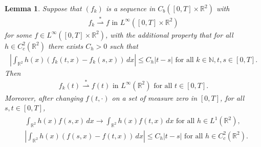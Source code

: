 \documentclass[11pt,reqno,xcolor=svgnames]{amsart}
\def\R{{\mathbb R}}
\def\N{{\mathbb N}}
\theoremstyle{plain}
\newtheorem{lemma}[theorem]{Lemma}
\theoremstyle{definition}
\theoremstyle{plain}
\theoremstyle{remark}
\newcommand{\abs}[1]{\left\vert#1\right\vert}
\newcommand{\iny}{\ensuremath{\infty}}
\newcommand{\wstar}{\overset{*}{\rightharpoonup}}
\begin{document}
\begin{lemma}\label{L:WeakStarSectionalConvergence}
    Suppose that  $(f_k)$ is a sequence in $C_b([0, T] \times \R^2)$ with
    \begin{align*}
        f_k \wstar f \text{ in } L^\iny([0, T] \times \R^2)
    \end{align*}
    for some $f \in L^\iny([0, T] \times \R^2)$, with the additional property that for all $h \in C_c^2(\R^2)$ there exists $C_h > 0$ such that
    \begin{align*}
        \abs{\int_{\R^2} h(x) (f_k(t, x) - f_k(s, x)) \, dx}
            \le C_h \abs{t - s}
            \text{ for all } k \in \N, t, s \in [0, T].
    \end{align*}
    Then 
    \begin{align*}
        f_k(t) \wstar f(t)
            \text{ in } L^\iny(\R^2)
            \text{ for all } t \in [0, T].
    \end{align*}
        Moreover, after changing $f(t, \cdot)$ on a set of measure zero in $[0, T]$, for all $s, t \in [0, T]$,
    \begin{align}\label{e:WeakTimeContinuityOff}
        \begin{split}
            &\int_{\R^2} h(x) f(s, x) \, dx
                \to \int_{\R^2} h(x) f(t, x) \, dx
                \text{ for all } h \in L^1(\R^2), \\
            &\abs{\int_{\R^2} h(x) (f(s, x) - f(t, x)) \, dx}
                 \le C_h \abs{t - s}
                 \text{ for all } h \in C_c^2(\R^2).
            \end{split}
    \end{align}
\end{lemma}
\end{document}
